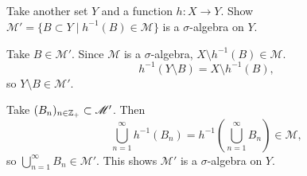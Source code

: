 \documentclass[12pt]{article}
\begin{document}
\subsection{}
Take another set $Y$ and a function $h:X \rightarrow Y$. 
Show $\mathscr{M}' = \{B \subset Y \mid h^{-1}(B) \in \mathscr{M}\}$ is a $\sigma$-algebra on $Y$. 

\noindent\dotfill 

Take $B \in \mathscr{M}'$. 
Since $\mathscr{M}$ is a $\sigma$-algebra, $X \setminus h^{-1}(B) \in \mathscr{M}$. 
$$h^{-1}(Y \setminus B) = X \setminus h^{-1}(B),$$
so $Y \setminus B \in \mathscr{M}'$. 

Take $(B_n)_{n \in \mathbb{Z}_{+}} \subset \mathscr{M}'$. 
Then 
$$\bigcup_{n = 1}^{\infty} h^{-1}(B_n) = h^{-1}(\bigcup_{n = 1}^{\infty} B_n) \in \mathscr{M},$$
so $\bigcup_{n = 1}^{\infty} B_n \in \mathscr{M}'$. 
This shows $\mathscr{M}'$ is a $\sigma$-algebra on $Y$. 
\end{document}
